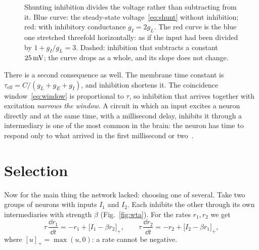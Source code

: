 \begin{figure}[t]
\centering
{}
\caption{Shunting inhibition divides the voltage rather than subtracting from it. Blue curve: the steady-state voltage~\eqref{eq:shunt} without inhibition; red: with inhibitory conductance $g_I=2g_L$. The red curve is the blue one stretched threefold horizontally: as if the input had been divided by $1+g_I/g_L=3$. Dashed: inhibition that subtracts a constant $25\,\text{mV}$; the curve drops as a whole, and its slope does not change.}
\label{fig:shunt}
\end{figure}

There is a second consequence as well. The membrane time constant is $\tau_{\text{eff}}=C/(g_L+g_E+g_I)$, and inhibition shortens it. The coincidence window~\eqref{eq:window} is proportional to $\tau$, so inhibition that arrives together with excitation \emph{narrows the window}. A circuit in which an input excites a neuron directly and at the same time, with a millisecond delay, inhibits it through a  intermediary is one of the most common in the brain: the neuron has time to respond only to what arrived in the first millisecond or two~\cite{Pouille2001}.

\section{Selection}

Now for the main thing the  network lacked: choosing one of several. Take two groups of  neurons with inputs $I_1$ and $I_2$. Each inhibits the other through its own  intermediaries with strength $\beta$ (Fig.~\ref{fig:wta}). For the rates $r_1,r_2$ we get
\begin{equation}
\tau\,\frac{\dd r_1}{\dd t} = -r_1 + \bigl[I_1-\beta r_2\bigr]_+ ,\qquad
\tau\,\frac{\dd r_2}{\dd t} = -r_2 + \bigl[I_2-\beta r_1\bigr]_+ ,
\label{eq:wta}
\end{equation}
where $[u]_+=\max(u,0)$: a rate cannot be negative.

